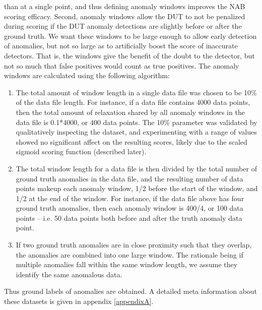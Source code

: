 \documentclass[12pt]{article}
\begin{document}
than at a single point, and thus defining anomaly windows improves the
NAB scoring efficacy. Second, anomaly windows allow the DUT to not be
penalized during scoring if the DUT anomaly detections are slightly before
or after the ground truth. We want these windows to be large enough to
allow early detection of anomalies, but not so large as to artificially boost
the score of inaccurate detectors. That is, the windows give the benefit of
the doubt to the detector, but not so much that false positives would count
as true positives. The anomaly windows are calculated using the following
algorithm:
\begin{enumerate}
\item The total amount of window length in a single data file was chosen
to be 10\% of the data file length. For instance, if a data file contains
4000 data points, then the total amount of relaxation shared by all
anomaly windows in the data file is 0.1*4000, or 400 data points.
The 10\% parameter was validated by qualitatively inspecting the
dataset, and experimenting with a range of values showed no
significant affect on the resulting scores, likely due to the scaled
sigmoid scoring function (described later).
\item The total window length for a data file is then divided by the total
number of ground truth anomalies in the data file, and the resulting
number of data points makeup each anomaly window, 1/2 before
the start of the window, and 1/2 at the end of the window. For
instance, if the data file above has four ground truth anomalies,
then each anomaly window is 400/4, or 100 data points – i.e. 50
data points both before and after the truth anomaly data point.
\item If two ground truth anomalies are in close proximity such that they
overlap, the anomalies are combined into one large window. The
rationale being if multiple anomalies fall within the same window
length, we assume they identify the same anomalous data.
\end{enumerate}
Thus ground labels of anomalies are obtained. A detailed meta information about these datasets is given in appendix \ref{appendixA}. 
\end{document}
